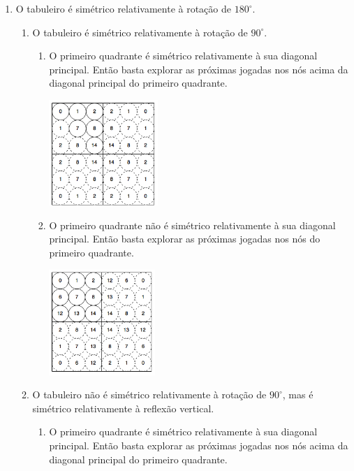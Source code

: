 \begin{enumerate}
	\item O tabuleiro é simétrico relativamente à rotação de $180^{\circ}$.
		\begin{enumerate}
			\item O tabuleiro é simétrico relativamente à rotação de $90^{\circ}$.
			\begin{enumerate}
				\item O primeiro quadrante é simétrico relativamente à sua diagonal principal. Então basta explorar as próximas jogadas nos nós acima da diagonal principal do primeiro quadrante.
\begin{table}[H]
\centering
\includegraphics[height=4cm]{images/p180_90_dp0.png}
\end{table}			
				\item O primeiro quadrante não é simétrico relativamente à sua diagonal principal. Então basta explorar as próximas jogadas nos nós do primeiro quadrante.
\begin{table}[H]
\centering
\includegraphics[height=4cm]{images/p180_90.png}
\end{table}			
			\end{enumerate}
			\item O tabuleiro não é simétrico relativamente à rotação de $90^{\circ}$, mas é simétrico relativamente à reflexão vertical.
			\begin{enumerate}
				\item O primeiro quadrante é simétrico relativamente à sua diagonal principal. Então basta explorar as próximas jogadas nos nós acima da diagonal principal do primeiro quadrante.
\begin{table}[H]
\centering

\end{table}
\end{enumerate}
\end{enumerate}
\end{enumerate}
